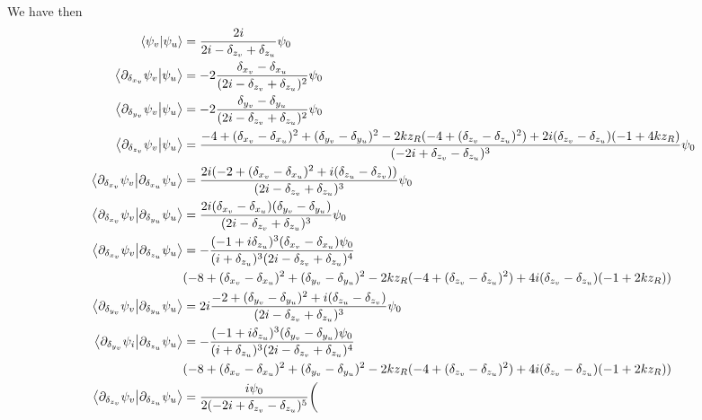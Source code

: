 \documentclass[reprint,amsmath,amssymb,aps,prl,floatfix,groupedaddress,superscriptaddress]{revtex4-2}
\begin{document}
We have then
\begin{align}
    \braket{\psi_v}{\psi_u} &= \frac{2 i}{2 i  - \delta_{z_v} + \delta_{z_u}} \psi_0 \\
    \braket{\partial_{\delta_{x_v}}\psi_v}{\psi_u} &=  -2 \frac{\delta_{x_v} - \delta_{x_u}}{(2i - \delta_{z_v} + \delta_{z_u})^2} \psi_0\\
    \braket{\partial_{\delta_{y_v}}\psi_v}{\psi_u} &=  -2 \frac{\delta_{y_v} - \delta_{y_u}}{(2i - \delta_{z_v} + \delta_{z_u})^2} \psi_0\\
    \braket{\partial_{\delta_{z_v}}\psi_v}{\psi_u} &= \frac{-4 + (\delta_{x_v} - \delta_{x_u})^2 + (\delta_{y_v} - \delta_{y_u})^2 - 2 k z_R (-4 + (\delta_{z_v} - \delta_{z_u})^2) +  2i (\delta_{z_v} - \delta_{z_u})  (-1 + 4 k z_R)
    }{(-2i + \delta_{z_v} - \delta_{z_u})^3} \psi_0 \\
    \braket{\partial_{\delta_{x_v}}\psi_v}{\partial_{\delta_{x_u}}\psi_u} &= \frac{2i (-2 + (\delta_{x_v} - \delta_{x_u})^2 + i (\delta_{z_u} - \delta_{z_v}))}{(2i - \delta_{z_v} + \delta_{z_u})^3} \psi_0 \\
    \braket{\partial_{\delta_{x_v}}\psi_v}{\partial_{\delta_{y_u}}\psi_u} &= \frac{2i (\delta_{x_v} - \delta_{x_u}) (\delta_{y_v} - \delta_{y_u})}{ (2i - \delta_{z_v} + \delta_{z_u})^3} \psi_0 \\
    \braket{\partial_{\delta_{x_v}}\psi_v}{\partial_{\delta_{z_u}}\psi_u} &= -\frac{(-1 + i \delta_{z_u})^3 (\delta_{x_v} - \delta_{x_u}) \psi_0}{(i + \delta_{z_u})^3 (2i - \delta_{z_v} + \delta_{z_u})^4} \\
    &(-8 + (\delta_{x_v} - \delta_{x_u})^2 + (\delta_{y_v} - \delta_{y_u})^2  - 2 k z_R (-4 + (\delta_{z_v} - \delta_{z_u})^2) + 4i (\delta_{z_v} - \delta_{z_u}) (-1 + 2 k z_R)) \nonumber \\
    \braket{\partial_{\delta_{y_v}}\psi_v}{\partial_{\delta_{y_u}}\psi_u} &= 2i \frac{-2 + (\delta_{y_v} - \delta_{y_u})^2 + i (\delta_{z_u} - \delta_{z_v})}{ (2i - \delta_{z_v} + \delta_{z_u})^3} \psi_0\\
    \braket{\partial_{\delta_{y_v}}\psi_i}{\partial_{\delta_{z_u}}\psi_u} &= - \frac{(-1 + i \delta_{z_u})^3 (\delta_{y_v} - \delta_{y_u}) \psi_0}{(i + \delta_{z_u})^3 (2i - \delta_{z_v} + \delta_{z_u})^4}  \\
    & (-8 + (\delta_{x_v} - \delta_{x_u})^2 + (\delta_{y_v} - \delta_{y_u})^2 - 2 k z_R (-4 + (\delta_{z_v} - \delta_{z_u})^2) + 4i (\delta_{z_v} - \delta_{z_u}) (-1 + 2 k z_R)) \nonumber \\
    \braket{\partial_{\delta_{z_v}}\psi_v}{\partial_{\delta_{z_u}}\psi_u} &= \frac{i \psi_0}{2 (-2i + \delta_{z_v} - \delta_{z_u})^5} \bigg(  \\

\end{align}
\end{document}
